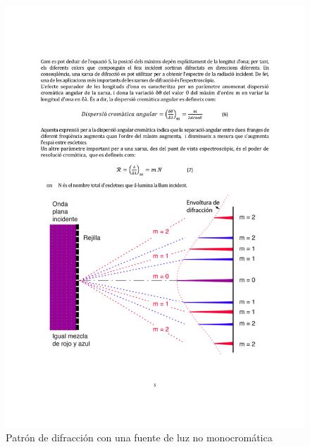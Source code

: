 \documentclass[12pt]{article}
\numberwithin{table}{section}
\numberwithin{figure}{section}
\numberwithin{equation}{section}
\begin{document}
\begin{figure}
	\centering
	\includegraphics[scale = 0.5]{dispersion.pdf}
	\caption{Patrón de difracción con una fuente de luz no monocromática}
	\label{fig:dispersion}
\end{figure}
\end{document}
